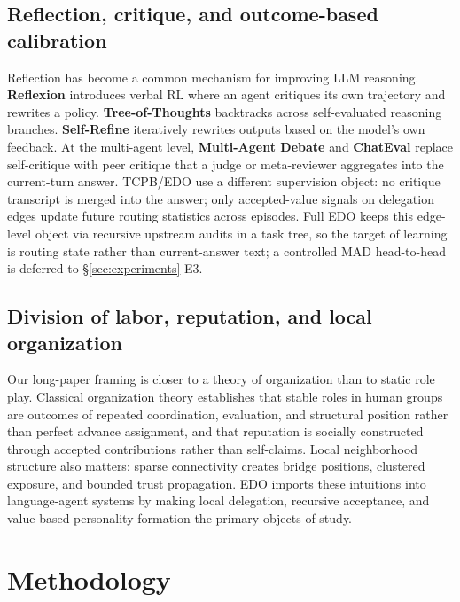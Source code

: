 \documentclass[11pt]{article}
\begin{document}
\subsection{Reflection, critique, and outcome-based calibration}

Reflection has become a common mechanism for improving LLM reasoning. \textbf{Reflexion} \citep{shinn2023reflexion} introduces verbal RL where an agent critiques its own trajectory and rewrites a policy. \textbf{Tree-of-Thoughts} \citep{yao2023tot} backtracks across self-evaluated reasoning branches. \textbf{Self-Refine} \citep{madaan2023selfrefine} iteratively rewrites outputs based on the model's own feedback. At the multi-agent level, \textbf{Multi-Agent Debate} \citep{liang2023mad,du2024improving} and \textbf{ChatEval} \citep{chan2024chateval} replace self-critique with peer critique that a judge or meta-reviewer aggregates into the current-turn answer. TCPB/EDO use a different supervision object: no critique transcript is merged into the answer; only accepted-value signals on delegation edges update future routing statistics across episodes. Full EDO keeps this edge-level object via recursive upstream audits in a task tree, so the target of learning is routing state rather than current-answer text; a controlled MAD head-to-head is deferred to \S\ref{sec:experiments} E3.

\subsection{Division of labor, reputation, and local organization}

Our long-paper framing is closer to a theory of organization than to static role play. Classical organization theory \citep{galbraith1973designing,mintzberg1979structuring} establishes that stable roles in human groups are outcomes of repeated coordination, evaluation, and structural position rather than perfect advance assignment, and that reputation is socially constructed through accepted contributions rather than self-claims. Local neighborhood structure also matters: sparse connectivity creates bridge positions, clustered exposure, and bounded trust propagation. EDO imports these intuitions into language-agent systems by making local delegation, recursive acceptance, and value-based personality formation the primary objects of study.

\section{Methodology}
\label{sec:methodology}
\end{document}
